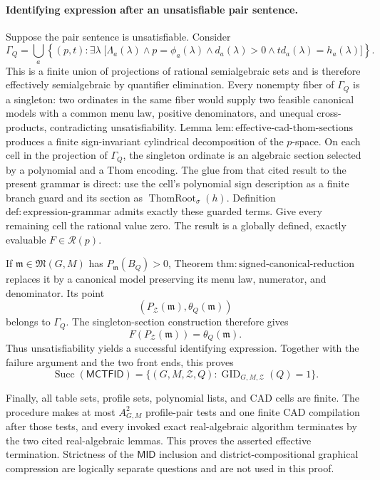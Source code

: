 \paragraph{Identifying expression after an unsatisfiable pair sentence.}
Suppose the pair sentence is unsatisfiable.  Consider
\[
 \Gamma_Q
 =\bigcup_a\left\{(p,t):
 \exists\lambda\;\bigl[
 \Lambda_a(\lambda)\wedge p=\phi_a(\lambda)
 \wedge d_a(\lambda)>0\wedge t d_a(\lambda)=h_a(\lambda)
 \bigr]\right\}.
\]
This is a finite union of projections of rational semialgebraic sets and is therefore effectively semialgebraic by quantifier elimination.  Every nonempty fiber of \(\Gamma_Q\) is a singleton: two ordinates in the same fiber would supply two feasible canonical models with a common menu law, positive denominators, and unequal cross-products, contradicting unsatisfiability.  Lemma \(\mathrm{lem:effective\text{-}cad\text{-}thom\text{-}sections}\) produces a finite sign-invariant cylindrical decomposition of the \(p\)-space.  On each cell in the projection of \(\Gamma_Q\), the singleton ordinate is an algebraic section selected by a polynomial and a Thom encoding.  The glue from that cited result to the present grammar is direct: use the cell's polynomial sign description as a finite branch guard and its section as \(\operatorname{ThomRoot}_{\sigma}(h)\).  Definition \(\mathrm{def:expression\text{-}grammar}\) admits exactly these guarded terms.  Give every remaining cell the rational value zero.  The result is a globally defined, exactly evaluable \(F\in\mathcal R(p)\).

If \(\mathfrak m\in\mathfrak M(G,M)\) has \(P_{\mathfrak m}(B_Q)>0\), Theorem \(\mathrm{thm:signed\text{-}canonical\text{-}reduction}\) replaces it by a canonical model preserving its menu law, numerator, and denominator.  Its point
\[
 \left(P_{\mathcal Z}(\mathfrak m),\theta_Q(\mathfrak m)\right)
\]
belongs to \(\Gamma_Q\).  The singleton-section construction therefore gives
\[
 F(P_{\mathcal Z}(\mathfrak m))=\theta_Q(\mathfrak m).
\]
Thus unsatisfiability yields a successful identifying expression.  Together with the failure argument and the two front ends, this proves
\[
 \operatorname{Succ}(\mathsf{MCTFID})
 =\{(G,M,\mathcal Z,Q):\operatorname{GID}_{G,M,\mathcal Z}(Q)=1\}.
\]

Finally, all table sets, profile sets, polynomial lists, and CAD cells are finite.  The procedure makes at most \(A_{G,M}^2\) profile-pair tests and one finite CAD compilation after those tests, and every invoked exact real-algebraic algorithm terminates by the two cited real-algebraic lemmas.  This proves the asserted effective termination.  Strictness of the \(\mathsf{MID}\) inclusion and district-compositional graphical compression are logically separate questions and are not used in this proof.